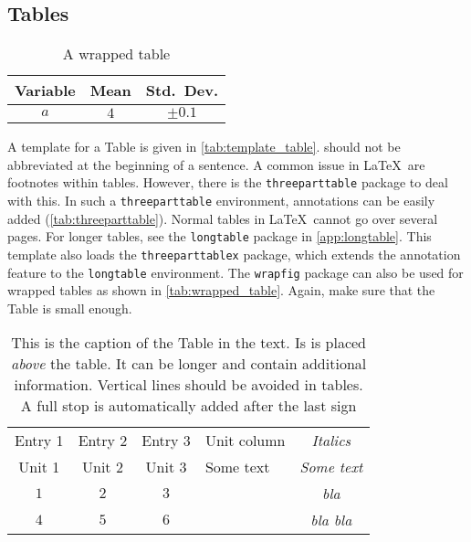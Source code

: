 \subsection{Tables}
\begin{wraptable}{r}{0.4\textwidth}
	\centering
	\caption{A wrapped table}\label{tab:wrapped_table}
	\begin{tabular}{@{}c c c@{}}
		\toprule
		Variable & Mean      & Std.~Dev.               \\
		\midrule
		$a$      & $\num{4}$ & $\pm\num{0.1}$ \\
		\bottomrule
	\end{tabular}
\end{wraptable}
A template for a Table is given in \autoref{tab:template_table}.  should not be abbreviated at the beginning of a sentence. A common issue in \LaTeX\ are footnotes within tables. However, there is the \verb+threeparttable+ package to deal with this. In such a \verb+threeparttable+ environment, annotations can be easily added (\autoref{tab:threeparttable}). Normal tables in \LaTeX\ cannot go over several pages. For longer tables, see the \verb+longtable+ package in \autoref{app:longtable}. This template also loads the \verb+threeparttablex+ package, which extends the annotation feature to the \verb+longtable+ environment. The \verb+wrapfig+ package can also be used for wrapped tables as shown in \autoref{tab:wrapped_table}. Again, make sure that the Table is small enough.
\begin{table}[tbh]
	\centering
	\caption[This is the caption of the Table in the List of Tables]{This is the caption of the Table in the text. Is is placed \emph{above} the table. It can be longer and contain additional information. Vertical lines should be avoided in tables. A full stop is automatically added after the last sign}\label{tab:template_table}
	\begin{tabular}{c c c s >{\itshape} c}
		\toprule
		Entry 1 & Entry 2 & Entry 3 & \textnormal{Unit column} & Italics   \\
		Unit 1  & Unit 2  & Unit 3  & \textnormal{Some text}   & Some text \\
		\midrule
		$\num{1}$       & $\num{2}$       & $\num{3}$       & \joule                   & bla       \\
		$\num{4}$       & $\num{5}$       & $\num{6}$       & \pascal\per\square\metre & bla bla   \\
		\bottomrule
	\end{tabular}
\end{table}
